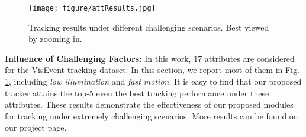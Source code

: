 \documentclass[journal]{IEEEtran}
\begin{document}
\begin{table}
\center
\caption{Up: component analysis of our tracking model; Down: modality analysis of PrDIMP18 on all testing videos, motion blur (MB), and low illumination (LI) subset.}
\label{CMAnalysis} 
\end{table} 



\begin{figure}
\center
\texttt{[image: figure/attResults.jpg]}
\caption{Tracking results under different challenging scenarios. Best viewed by zooming in.}   
\label{attributeResults}
\end{figure} 	


\noindent 
\textbf{Influence of Challenging Factors:}
In this work, 17 attributes are considered for the VisEvent tracking dataset. In this section, we report most of them in Fig. \ref{attributeResults}, including \emph{low illumination} and \emph{fast motion}. It is easy to find that our proposed tracker attains the top-5 even the best tracking performance under these attributes. These results demonstrate the effectiveness of our proposed modules for tracking under extremely challenging scenarios. More results can be found on our project page. 
\end{document}
